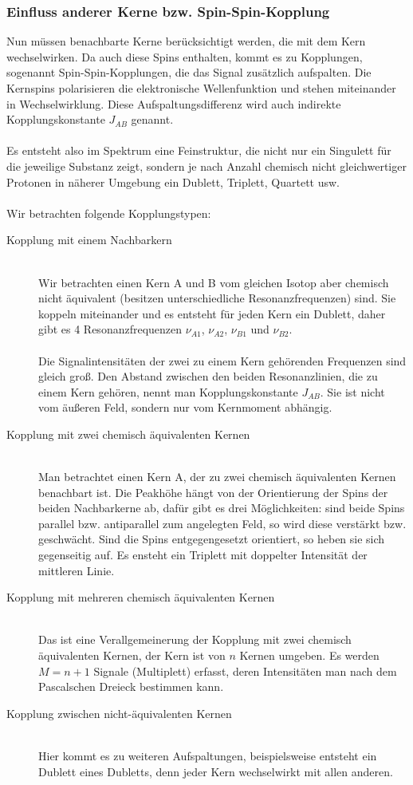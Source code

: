 \documentclass[a4paper,titlepage]{scrartcl}
\numberwithin{equation}{section}
\begin{document}
\subsubsection{Einfluss anderer Kerne bzw. Spin-Spin-Kopplung}
Nun müssen benachbarte Kerne berücksichtigt werden, die mit dem Kern wechselwirken. Da auch diese Spins enthalten, kommt es zu Kopplungen, sogenannt Spin-Spin-Kopplungen, die das Signal zusätzlich aufspalten. Die Kernspins polarisieren die elektronische Wellenfunktion und stehen miteinander in Wechselwirklung. Diese Aufspaltungsdifferenz wird auch indirekte Kopplungskonstante $J_{AB}$ genannt.\\ \\
Es entsteht also im Spektrum eine Feinstruktur, die nicht nur ein Singulett für die jeweilige Substanz zeigt, sondern je nach Anzahl chemisch nicht gleichwertiger Protonen in näherer Umgebung ein Dublett, Triplett, Quartett usw.\\ \\
Wir betrachten folgende Kopplungstypen:
\begin{description}
\item[Kopplung mit einem Nachbarkern]\hfill \\ Wir betrachten einen Kern A und B vom gleichen Isotop aber chemisch nicht äquivalent (besitzen unterschiedliche Resonanzfrequenzen) sind. Sie koppeln miteinander und es entsteht für jeden Kern ein Dublett, daher gibt es 4 Resonanzfrequenzen $\nu_{A1}$, $\nu_{A2}$, $\nu_{B1}$ und $\nu_{B2}$.\\ \\
Die Signalintensitäten der zwei zu einem Kern gehörenden Frequenzen sind gleich groß. Den Abstand zwischen den beiden Resonanzlinien, die zu einem Kern gehören, nennt man Kopplungskonstante $J_{AB}$. Sie ist nicht vom äußeren Feld, sondern nur vom Kernmoment abhängig.
\item[Kopplung mit zwei chemisch äquivalenten Kernen]\hfill \\ Man betrachtet einen Kern A, der zu zwei chemisch äquivalenten Kernen benachbart ist. Die Peakhöhe hängt von der Orientierung der Spins der beiden Nachbarkerne ab, dafür gibt es drei Möglichkeiten: sind beide Spins parallel bzw. antiparallel zum angelegten Feld, so wird diese verstärkt bzw. geschwächt. Sind die Spins entgegengesetzt orientiert, so heben sie sich gegenseitig auf. Es ensteht ein Triplett mit doppelter Intensität der mittleren Linie.
\item[Kopplung mit mehreren chemisch äquivalenten Kernen]\hfill \\ Das ist eine Verallgemeinerung der Kopplung mit zwei chemisch äquivalenten Kernen, der Kern ist von $n$ Kernen umgeben. Es werden $M=n+1$ Signale (Multiplett) erfasst, deren Intensitäten man nach dem Pascalschen Dreieck bestimmen kann.
\item[Kopplung zwischen nicht-äquivalenten Kernen]\hfill \\ Hier kommt es zu weiteren Aufspaltungen, beispielsweise entsteht ein Dublett eines Dubletts, denn jeder Kern wechselwirkt mit allen anderen.
\end{description}
\end{document}
